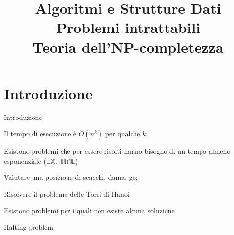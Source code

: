 
\title[ASD - Problemi \NP-completi]{\textbf{Algoritmi e Strutture Dati}\\[12pt]Problemi intrattabili\\Teoria dell'NP-completezza}


\usepackage{xcolor}
\usepackage{colortbl}

\newcommand{\PTIME}{\mbox{\sc $\mathbb{P}$}}
\renewcommand{\NP}{\mbox{$\mathbb{NP}$}}
\newcommand{\TIME}{\mbox{$\mathbb{TIME}$}}
\newcommand{\EXPTIME}{\mbox{$\mathbb{EXPTIME}$}}
\newcommand{\SPACE}{\mbox{$\mathbb{SPACE}$}}
\newcommand{\PSPACE}{\mbox{$\mathbb{PSPACE}$}}

\newcommand{\R}[1]{\textcolor{red}{#1}}
\newcommand{\B}[1]{\textcolor{blue}{#1}}

\renewcommand{\arraystretch}{1.4}
\graphicspath{{figs/18/}}




\FrameTitle{}

\FrameContent



\section{Introduzione}

\begin{frame}{Introduzione}

\vspace{-9pt}
\BIL
\item  Il tempo di esecuzione è $O(n^k)$ per qualche $k$; 
\EIL

\medskip
{}
\BIL
\item Esistono problemi che per essere risolti hanno
  bisogno di un tempo almeno esponenziale (\EXPTIME)
    \BI
    \item Valutare una posizione di scacchi, dama, go; 
    \item Risolvere il problema delle Torri di Hanoi
    \EI
\item Esistono problemi per i quali non esiste alcuna soluzione
  \BI
  \item Halting problem
  \EI
\EIL

\end{frame}

